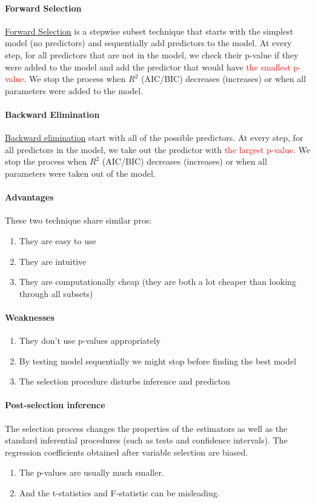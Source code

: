 \documentclass[11pt]{article}
\newcommand{\under}[1]{\underline{#1}}
\begin{document}
\paragraph{Forward Selection}
\under{Forward Selection} is a stepwise subset technique that starts with the simplest model (no predictors) and sequentially add predictors to the model. At every step, for all predictors that are not in the model, we check their p-value if they were added to the model and add the predictor that would have \textcolor{red}{the smallest p-value}. We stop the process when $R^2$ (AIC/BIC) decreases (increases) or when all parameters were added to the model.
\paragraph{Backward Elimination}
\under{Backward elimination} start with all of the possible predictors. At every step, for all predictors in the model, we take out the predictor with \textcolor{red}{the largest p-value}. We stop the process when $R^2$ (AIC/BIC) decreases (increases) or when all parameters were taken out of the model.
\paragraph{Advantages}
These two technique share similar pros:
\begin{enumerate}
	\item They are easy to use
	\item They are intuitive
	\item They are computationally cheap (they are both a lot cheaper than looking through all subsets)
\end{enumerate}
\paragraph{Weaknesses}
\begin{enumerate}
	\item They don't use p-values appropriately
	\item By testing model sequentially we might stop before finding the best model
	\item The selection procedure disturbs inference and predicton
\end{enumerate}
\paragraph{Post-selection inference}
The selection process changes the properties of the estimators as well as the standard inferential procedures (such as tests and confidence intervals). The regression coefficients obtained after variable selection are biased.
\begin{enumerate}
	\item The p-values are usually much smaller.
	\item And the t-statistics and F-statistic can be misleading.
\end{enumerate}
\end{document}

